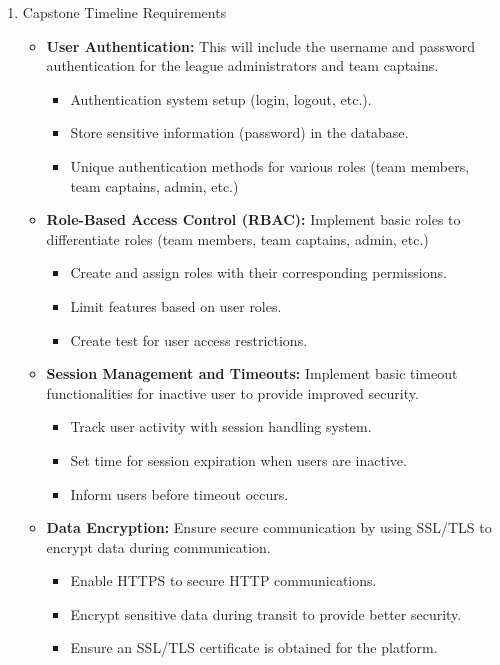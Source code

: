 \documentclass{article}
\begin{document}
\begin{enumerate}
	\item Capstone Timeline Requirements
		\begin{itemize}
			\item \textbf{User Authentication:} This will include the username and password authentication for the league administrators and team captains.
			\begin{itemize}
				\item Authentication system setup (login, logout, etc.).
				\item Store sensitive information (password) in  the database.
				\item Unique authentication methods for various roles (team members, team captains, admin, etc.)
			\end{itemize}
			\item \textbf{Role-Based Access Control (RBAC):} Implement basic roles to differentiate roles (team members, team captains, admin, etc.)
			\begin{itemize}
				\item Create and assign roles with their corresponding permissions.
				\item Limit features based on user roles.
				\item Create test for user access restrictions.
			\end{itemize}
			\item \textbf{Session Management and Timeouts:} Implement basic timeout functionalities for inactive user to provide improved security.
			\begin{itemize}
				\item Track user activity with session handling system.
				\item Set time for session expiration when users are inactive.
				\item Inform users before timeout occurs.
			\end{itemize}
			\item \textbf{Data Encryption:} Ensure secure communication by using SSL/TLS to encrypt data during communication.
			\begin{itemize}
				\item Enable HTTPS to secure HTTP communications.
				\item Encrypt sensitive data during transit to provide better security.
				\item Ensure an SSL/TLS certificate is obtained for the platform.
			\end{itemize}

\end{itemize}
\end{enumerate}
\end{document}
